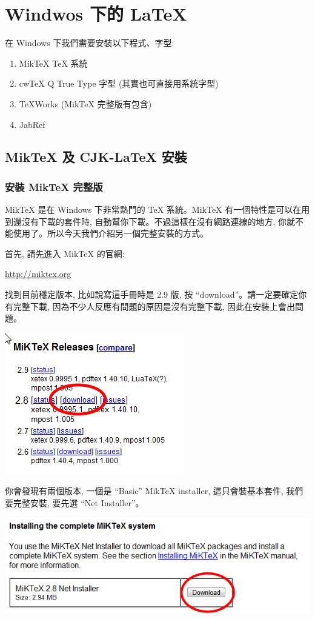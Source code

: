 \documentclass[12pt]{report}
\begin{document}
\chapter{Windwos 下的 \LaTeX}
在 Windows 下我們需要安裝以下程式、字型:
\begin{enumerate}
\item MikTeX \TeX{} 系統
\item cw\TeX{} Q True Type 字型 (其實也可直接用系統字型)
\item TeXWorks (MikTeX 完整版有包含)
\item JabRef
\end{enumerate}

\section{MikTeX 及 CJK-\LaTeX{} 安裝}
\subsection{安裝 MikTeX 完整版}
MikTeX 是在 Windows 下非常熱門的 \TeX{} 系統。MikTeX 有一個特性是可以在用到還沒有下載的套件時,  自動幫你下載。不過這樣在沒有網路連線的地方, 你就不能使用了。所以今天我們介紹另一個完整安裝的方式。

首先, 請先進入 MikTeX 的官網:

\url{http://miktex.org}

找到目前穩定版本, 比如說寫這手冊時是 2.9 版, 按 ``download''。請一定要確定你有完整下載, 因為不少人反應有問題的原因是沒有完整下載, 因此在安裝上會出問題。

\begin{center}
\includegraphics[scale=0.5]{miktex.png}
\end{center}

你會發現有兩個版本, 一個是 ``Basic'' MikTeX installer, 這只會裝基本套件, 我們要完整安裝, 要先選 ``Net Installer''。

\begin{center}
\includegraphics[scale=0.5]{miktexInstaller.png}
\end{center}
\end{document}
